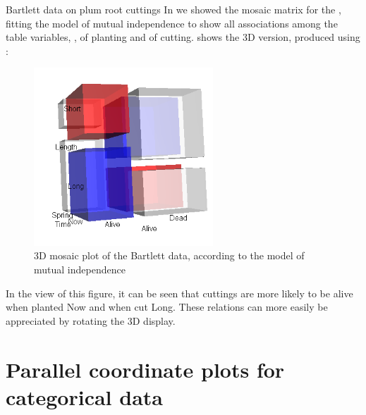 \documentclass[11pt]{book}
\renewenvironment{knitrout}{\small\renewcommand{\baselinestretch}{.85}}{} %
\begin{document}
\begin{Example}[bartlett-3d]{Bartlett data on plum root cuttings}
In  we showed the mosaic matrix for the
, fitting the model of mutual independence
to show all associations among the table variables,
,  of planting and  of cutting.
 shows the 3D version, produced using
:
\begin{knitrout}
\color{fgcolor}\begin{kframe}
\begin{alltt}
\end{alltt}
\end{kframe}
\end{knitrout}

\begin{figure}[!htb]
 \centering
 \includegraphics[width=0.6\textwidth]{ch05/fig/mos3d-bartlett.png}
 \caption{3D mosaic plot of the Bartlett data, according to the model of mutual independence}\label{fig:mos3d-bartlett}
\end{figure}

In the view of this figure, it can be seen that cuttings are more likely to be alive
when planted Now and when cut Long. These relations can more easily be
appreciated by rotating the 3D display.
\end{Example}


\section{Parallel coordinate plots for categorical data}\label{sec:parallel}

\end{document}
